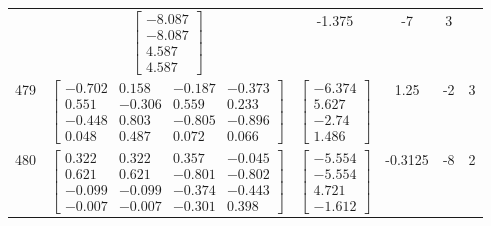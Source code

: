 \documentclass[a4paper,12pt]{article}
\begin{document}
\begin{tabular}{c c c c c c}
&
$\begin{bmatrix} -8.087 \\ -8.087 \\ 4.587 \\ 4.587 \end{bmatrix}$
&
-1.375
&
-7
&
3
\\
479
&
$\begin{bmatrix} -0.702 & 0.158 & -0.187 & -0.373 \\ 0.551 & -0.306 & 0.559 & 0.233 \\ -0.448 & 0.803 & -0.805 & -0.896 \\ 0.048 & 0.487 & 0.072 & 0.066 \end{bmatrix}$
&
$\begin{bmatrix} -6.374 \\ 5.627 \\ -2.74 \\ 1.486 \end{bmatrix}$
&
1.25
&
-2
&
3
\\
480
&
$\begin{bmatrix} 0.322 & 0.322 & 0.357 & -0.045 \\ 0.621 & 0.621 & -0.801 & -0.802 \\ -0.099 & -0.099 & -0.374 & -0.443 \\ -0.007 & -0.007 & -0.301 & 0.398 \end{bmatrix}$
&
$\begin{bmatrix} -5.554 \\ -5.554 \\ 4.721 \\ -1.612 \end{bmatrix}$
&
-0.3125
&
-8
&
2
\\
\end{tabular} \egroup \newpage
\end{document}
